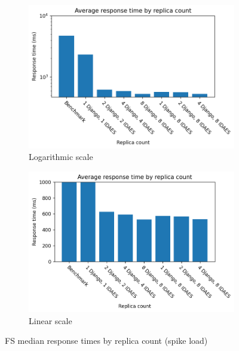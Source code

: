 \begin{figure}[H]
    \centering
    \begin{subfigure}{.5\textwidth}
      \centering
      \includegraphics[width=\linewidth]{figures/fs-replica-count-rt-comparison-spike.png}
      \caption{Logarithmic scale}
    \end{subfigure}%
    \begin{subfigure}{.5\textwidth}
      \centering
      \includegraphics[width=\linewidth]{figures/fs-replica-count-rt-comparison-spike-linear.png}
      \caption{Linear scale}
    \end{subfigure}

    \caption{FS median response times by replica count (spike load)}
    \label{figure:fs-replica-count-rt-comp-spike}
\end{figure}

